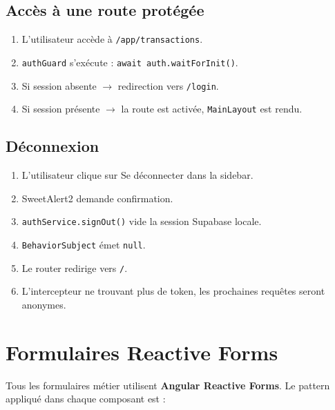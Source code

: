 \documentclass[12pt,a4paper]{article}
\begin{document}
\subsection{Accès à une route protégée}

\begin{enumerate}
  \item L'utilisateur accède à \texttt{/app/transactions}.
  \item \texttt{authGuard} s'exécute : \texttt{await auth.waitForInit()}.
  \item Si session absente $\to$ redirection vers \texttt{/login}.
  \item Si session présente $\to$ la route est activée, \texttt{MainLayout} est rendu.
\end{enumerate}

\subsection{Déconnexion}

\begin{enumerate}
  \item L'utilisateur clique sur \og Se déconnecter \fg{} dans la sidebar.
  \item SweetAlert2 demande confirmation.
  \item \texttt{authService.signOut()} vide la session Supabase locale.
  \item \texttt{BehaviorSubject} émet \texttt{null}.
  \item Le router redirige vers \texttt{/}.
  \item L'intercepteur ne trouvant plus de token, les prochaines requêtes seront anonymes.
\end{enumerate}

\section{Formulaires Reactive Forms}

Tous les formulaires métier utilisent \textbf{Angular Reactive Forms}.
Le pattern appliqué dans chaque composant est :
\end{document}
